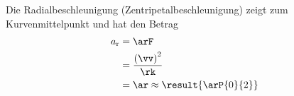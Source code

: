 Die Radialbeschleunigung (Zentripetalbeschleunigung) zeigt zum Kurvenmittelpunkt und hat den Betrag
\begin{align}
 a_\text{r} &= \arF \\
   &= \frac{\left(\vv\right)^2}{\rk} \\
   &= \ar \approx \result{\arP{0}{2}}
\end{align}
